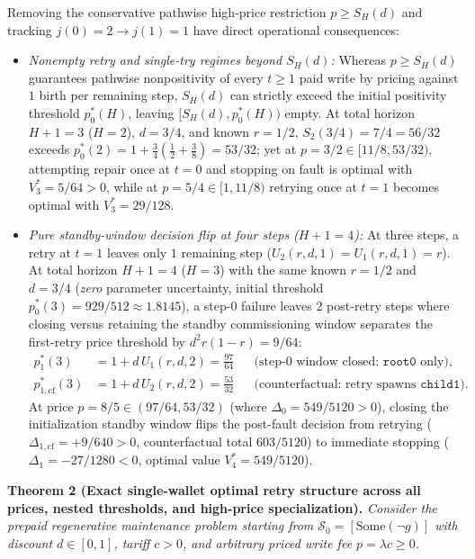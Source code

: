 \documentclass[11pt,a4paper]{article}
\providecommand{\tightlist}{\setlength{\itemsep}{2pt}\setlength{\parskip}{0pt}}
\begin{document}
Removing the conservative pathwise high-price restriction
\(p \ge S_H(d)\) and tracking \(j(0) = 2 \to j(1) = 1\) have direct
operational consequences:

\begin{itemize}
\tightlist
\item
  \emph{Nonempty retry and single-try regimes beyond \(S_H(d)\):}
  Whereas \(p \ge S_H(d)\) guarantees pathwise nonpositivity of every
  \(t \ge 1\) paid write by pricing against \(1\) birth per remaining
  step, \(S_H(d)\) can strictly exceed the initial positivity threshold
  \(p_0^*(H)\), leaving \([S_H(d), p_0^*(H))\) empty. At total horizon
  \(H + 1 = 3\) (\(H = 2\)), \(d = 3/4\), and known \(r = 1/2\),
  \(S_2(3/4) = 7/4 = 56/32\) exceeds
  \(p_0^*(2) = 1 + \frac{3}{4}(\frac{1}{2} + \frac{3}{8}) = 53/32\); yet
  at \(p = 3/2 \in [11/8, 53/32)\), attempting repair once at \(t = 0\)
  and stopping on fault is optimal with \(V_3^* = 5/64 > 0\), while at
  \(p = 5/4 \in [1, 11/8)\) retrying once at \(t = 1\) becomes optimal
  with \(V_3^* = 29/128\).
\item
  \emph{Pure standby-window decision flip at four steps
  (\(H + 1 = 4\)):} At three steps, a retry at \(t = 1\) leaves only
  \(1\) remaining step (\(U_2(r, d, 1) = U_1(r, d, 1) = r\)). At total
  horizon \(H + 1 = 4\) (\(H = 3\)) with the same known \(r = 1/2\) and
  \(d = 3/4\) (\emph{zero} parameter uncertainty, initial threshold
  \(p_0^*(3) = 929/512 \approx 1.8145\)), a step-\(0\) failure leaves
  \(2\) post-retry steps where closing versus retaining the standby
  commissioning window separates the first-retry price threshold by
  \(d^2 r(1 - r) = 9/64\): \[\begin{aligned}
  p_1^*(3) &= 1 + d\,U_1(r, d, 2) = \frac{97}{64}
  &&\text{(step-$0$ window closed: }\mathtt{root0}\text{ only)}, \\
  p_{1,\mathrm{cf}}^*(3) &= 1 + d\,U_2(r, d, 2) = \frac{53}{32}
  &&\text{(counterfactual: retry spawns }\mathtt{child1}\text{)}.
  \end{aligned}\] At price \(p = 8/5 \in (97/64, 53/32)\) (where
  \(\Delta_0 = 549/5120 > 0\)), closing the initialization standby
  window flips the post-fault decision from retrying
  (\(\Delta_{1,\mathrm{cf}} = +9/640 > 0\), counterfactual total
  \(603/5120\)) to immediate stopping (\(\Delta_1 = -27/1280 < 0\),
  optimal value \(V_4^* = 549/5120\)).
\end{itemize}

\textbf{Theorem 2 (Exact single-wallet optimal retry structure across
all prices, nested thresholds, and high-price specialization).}
\emph{Consider the prepaid regenerative maintenance problem starting
from \(\mathcal{S}_0 = [\mathrm{Some}(\neg g)]\) with discount
\(d \in [0,1]\), tariff \(c > 0\), and arbitrary priced write fee
\(p = \lambda c \ge 0\).}
\end{document}
